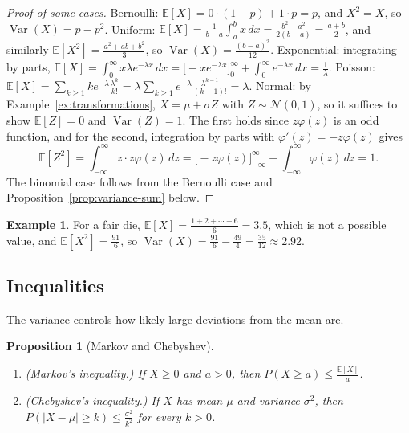 \documentclass[11pt]{article}
\newcommand{\E}{\mathbb{E}}
\DeclareMathOperator{\Var}{Var}
\theoremstyle{definition}
\newtheorem{example}[definition]{Example}
\theoremstyle{plain}
\newtheorem{proposition}[definition]{Proposition}
\theoremstyle{remark}
\begin{document}
\begin{proof}[Proof of some cases]
    Bernoulli: $\E[X] = 0 \cdot (1 - p) + 1 \cdot p = p$, and $X^2 = X$, so $\Var(X) = p - p^2$. Uniform: $\E[X] = \frac{1}{b - a}\int_a^b x\, dx = \frac{b^2 - a^2}{2(b - a)} = \frac{a + b}{2}$, and similarly $\E[X^2] = \frac{a^2 + ab + b^2}{3}$, so $\Var(X) = \frac{(b - a)^2}{12}$. Exponential: integrating by parts, $\E[X] = \int_0^\infty x\lambda e^{-\lambda x}\, dx = \big[-xe^{-\lambda x}\big]_0^\infty + \int_0^\infty e^{-\lambda x}\, dx = \frac{1}{\lambda}$. Poisson: $\E[X] = \sum_{k \geq 1} k e^{-\lambda}\frac{\lambda^k}{k!} = \lambda\sum_{k \geq 1} e^{-\lambda}\frac{\lambda^{k-1}}{(k-1)!} = \lambda$. Normal: by Example~\ref{ex:transformations}, $X = \mu + \sigma Z$ with $Z \sim \mathcal{N}(0, 1)$, so it suffices to show $\E[Z] = 0$ and $\Var(Z) = 1$. The first holds since $z\varphi(z)$ is an odd function, and for the second, integration by parts with $\varphi'(z) = -z\varphi(z)$ gives
    \[\E[Z^2] = \int_{-\infty}^\infty z \cdot z\varphi(z) \, dz = \big[-z\varphi(z)\big]_{-\infty}^\infty + \int_{-\infty}^\infty \varphi(z) \, dz = 1.\]
    The binomial case follows from the Bernoulli case and Proposition~\ref{prop:variance-sum} below.
\end{proof}

\begin{example}\label{ex:die-moments}
    For a fair die, $\E[X] = \frac{1 + 2 + \cdots + 6}{6} = 3.5$, which is not a possible value, and $\E[X^2] = \frac{91}{6}$, so $\Var(X) = \frac{91}{6} - \frac{49}{4} = \frac{35}{12} \approx 2.92$.
\end{example}

\subsection{Inequalities}

The variance controls how likely large deviations from the mean are.

\begin{proposition}[Markov and Chebyshev]\label{prop:markov}
    \begin{enumerate}
        \item (Markov's inequality.) If $X \geq 0$ and $a > 0$, then $P(X \geq a) \leq \frac{\E[X]}{a}$.
        \item (Chebyshev's inequality.) If $X$ has mean $\mu$ and variance $\sigma^2$, then $P(|X - \mu| \geq k) \leq \frac{\sigma^2}{k^2}$ for every $k > 0$.
    \end{enumerate}
\end{proposition}
\end{document}
